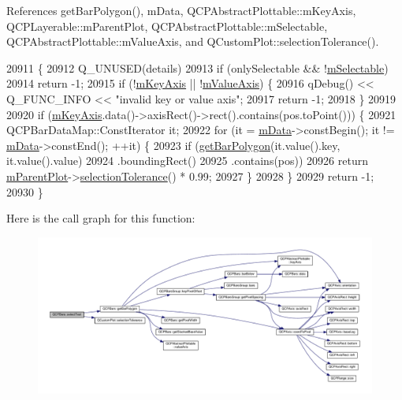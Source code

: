 References get\+Bar\+Polygon(), m\+Data, Q\+C\+P\+Abstract\+Plottable\+::m\+Key\+Axis, Q\+C\+P\+Layerable\+::m\+Parent\+Plot, Q\+C\+P\+Abstract\+Plottable\+::m\+Selectable, Q\+C\+P\+Abstract\+Plottable\+::m\+Value\+Axis, and Q\+Custom\+Plot\+::selection\+Tolerance().


\begin{DoxyCode}
20911                                                     \{
20912   Q\_UNUSED(details)
20913   if (onlySelectable && !\hyperlink{class_q_c_p_abstract_plottable_aceee52342c8e75727abcbd164986fdcb}{mSelectable})
20914     return -1;
20915   if (!\hyperlink{class_q_c_p_abstract_plottable_a426f42e254d0f8ce5436a868c61a6827}{mKeyAxis} || !\hyperlink{class_q_c_p_abstract_plottable_a2901452ca4aea911a1827717934a4bda}{mValueAxis}) \{
20916     qDebug() << Q\_FUNC\_INFO << \textcolor{stringliteral}{"invalid key or value axis"};
20917     \textcolor{keywordflow}{return} -1;
20918   \}
20919 
20920   \textcolor{keywordflow}{if} (\hyperlink{class_q_c_p_abstract_plottable_a426f42e254d0f8ce5436a868c61a6827}{mKeyAxis}.data()->axisRect()->rect().contains(pos.toPoint())) \{
20921     QCPBarDataMap::ConstIterator it;
20922     \textcolor{keywordflow}{for} (it = \hyperlink{class_q_c_p_bars_aef28d29d51ef84b608ecd22c55d531ff}{mData}->constBegin(); it != \hyperlink{class_q_c_p_bars_aef28d29d51ef84b608ecd22c55d531ff}{mData}->constEnd(); ++it) \{
20923       \textcolor{keywordflow}{if} (\hyperlink{class_q_c_p_bars_a1d118a76662cfd691a78c6f573e3f78c}{getBarPolygon}(it.value().key, it.value().value)
20924               .boundingRect()
20925               .contains(pos))
20926         \textcolor{keywordflow}{return} \hyperlink{class_q_c_p_layerable_aa2a528433e44db02b8aef23c1f9f90ed}{mParentPlot}->\hyperlink{class_q_custom_plot_a7b738074c75e80070ef6a10263c6cd69}{selectionTolerance}() * 0.99;
20927     \}
20928   \}
20929   \textcolor{keywordflow}{return} -1;
20930 \}
\end{DoxyCode}


Here is the call graph for this function\+:\nopagebreak
\begin{figure}[H]
\begin{center}
\leavevmode
\includegraphics[width=350pt]{class_q_c_p_bars_a0d37a9feb1d0baf73ce6e809db214445_cgraph}
\end{center}
\end{figure}


